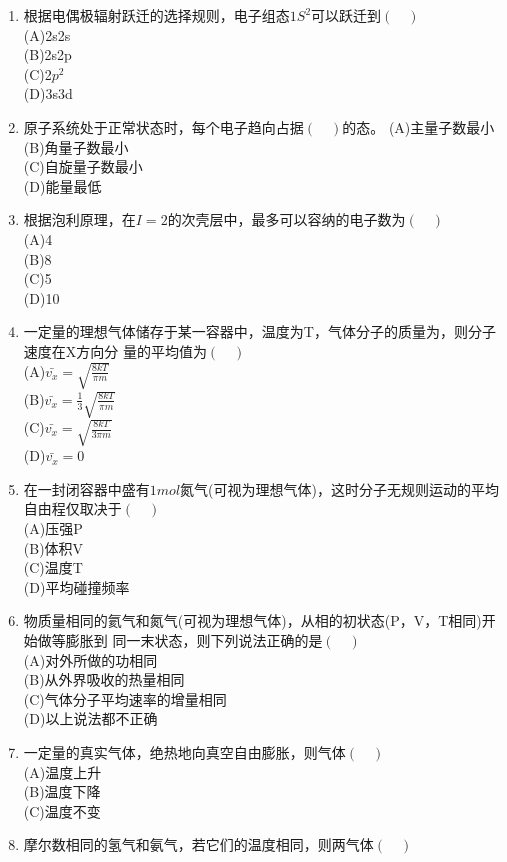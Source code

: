 \begin{enumerate}
\item 根据电偶极辐射跃迁的选择规则，电子组态$1S^2$可以跃迁到$(\quad)$\\
(A)2s2s\\
(B)2s2p\\
(C)2$p^2$\\
(D)3s3d
\item 原子系统处于正常状态时，每个电子趋向占据$(\quad)$的态。
(A)主量子数最小\\
(B)角量子数最小 \\
(C)自旋量子数最小\\
(D)能量最低
\item 根据泡利原理，在$I=2$的次壳层中，最多可以容纳的电子数为$(\quad)$\\
(A)4\\
(B)8\\
(C)5\\
(D)10
\item 一定量的理想气体储存于某一容器中，温度为T，气体分子的质量为，则分子速度在X方向分
量的平均值为$(\quad)$\\
(A)$\displaystyle \bar {v_x}=\sqrt{\frac{8kT}{\pi m}}$\\
(B)$\displaystyle \bar {v_x}=\frac{1}{3}\sqrt{\frac{8kT}{\pi m}}$\\
(C)$\displaystyle \bar {v_x}=\sqrt{\frac{8kT}{3\pi m}}$\\
(D)$\displaystyle \bar {v_x}=0$\\
\item 在一封闭容器中盛有$1mol$氮气(可视为理想气体)，这时分子无规则运动的平均自由程仅取决于$(\quad)$\\
(A)压强P\\
(B)体积V\\
(C)温度T\\
(D)平均碰撞频率
\item 物质量相同的氦气和氮气(可视为理想气体)，从相的初状态(P，V，T相同)开始做等膨胀到
同一末状态，则下列说法正确的是$(\quad)$\\
(A)对外所做的功相同\\
(B)从外界吸收的热量相同\\
(C)气体分子平均速率的增量相同\\
(D)以上说法都不正确
\item 一定量的真实气体，绝热地向真空自由膨胀，则气体$(\quad)$\\
(A)温度上升\\
(B)温度下降\\
(C)温度不变\\
\item 摩尔数相同的氢气和氨气，若它们的温度相同，则两气体$(\quad)$\\

\end{enumerate}

